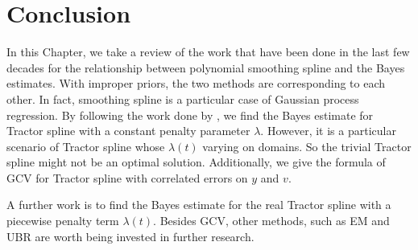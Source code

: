\section{Conclusion}

In this Chapter, we take a review of the work that have been done in the last few decades for the relationship between polynomial smoothing spline and the Bayes estimates. With improper priors, the two methods are corresponding to each other. In fact, smoothing spline is a particular case of Gaussian process regression. By following the work done by \cite{gu2013smoothing}, we find the Bayes estimate for Tractor spline with a constant penalty parameter $\lambda$.  However, it is a particular scenario of Tractor spline whose $\lambda(t)$ varying on domains. So the trivial Tractor spline might not be an optimal solution. Additionally, we give the formula of GCV for Tractor spline with correlated errors on $y$ and $v$. 


A further work is to find the Bayes estimate for the real Tractor spline with a piecewise penalty term $\lambda(t)$. Besides GCV, other methods, such as EM and UBR are worth being invested in further research. 








